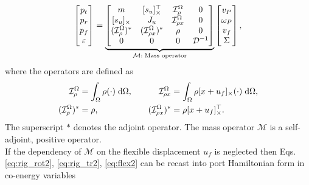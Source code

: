 \begin{equation}
\label{eq:mass_op}
\begin{bmatrix}
p_t \\ p_r \\ p_f \\ \varepsilon \\
\end{bmatrix} = 
\underbrace{\begin{bmatrix}
	m & \crmat{s_u}^\top & \mathcal{I}_\rho^{\Omega} & 0 \\
	\crmat{s_u} & J_u & \mathcal{I}_{\rho x}^{\Omega} & 0  \\
	(\mathcal{I}_\rho^{\Omega})^* & (\mathcal{I}_{\rho x}^{\Omega})^* & \rho & 0  \\
	0 & 0 & 0 & \mathcal{D}^{-1} \\
	\end{bmatrix}}_{\mathcal{M}: \; \text{Mass operator}}
\begin{bmatrix}
v_P \\ \omega_P  \\ v_f  \\ \Sigma \\
\end{bmatrix},
\end{equation}
where the operators are defined as
\begin{equation*}
\begin{aligned}
\mathcal{I}_\rho^\Omega &=\int_{\Omega} \rho (\cdot) \d{\Omega}, \\
(\mathcal{I}_\rho^{\Omega})^* &= \rho, \\
\end{aligned} \qquad
\begin{aligned} 
\mathcal{I}_{\rho x}^{\Omega} &= \int_\Omega \rho \crmat{x+u_f} (\cdot) \d{\Omega}, \\
(\mathcal{I}_{\rho x}^{\Omega})^* &= \rho \crmat{x+u_f}^\top. \\
\end{aligned}
\end{equation*}
The superscript $*$ denotes the adjoint operator. The mass operator $\mathcal{M}$ is a self-adjoint, positive operator. \\
If the dependency of $\mathcal{M}$ on the flexible displacement $u_f$ is neglected then Eqs. \eqref{eq:rig_rot2}, \eqref{eq:rig_tr2}, \eqref{eq:flex2} can be recast into port Hamiltonian form in co-energy variables
